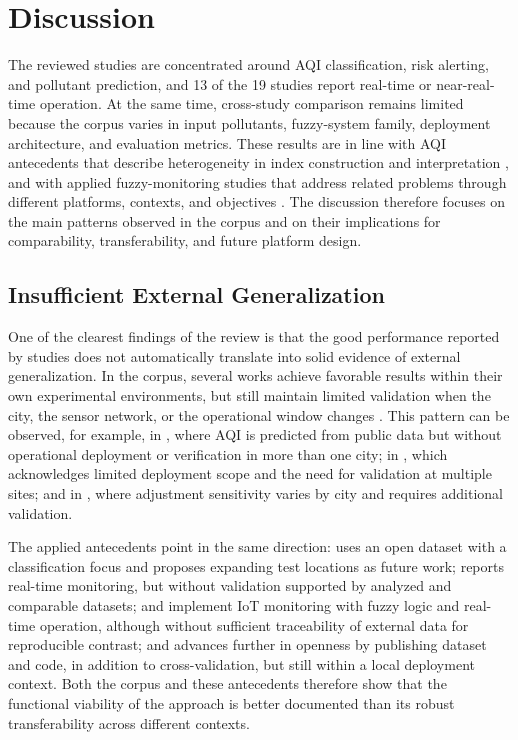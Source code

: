 \section{Discussion}
The reviewed studies are concentrated around AQI classification, risk alerting, and pollutant prediction, and 13 of the 19 studies report real-time or near-real-time operation. At the same time, cross-study comparison remains limited because the corpus varies in input pollutants, fuzzy-system family, deployment architecture, and evaluation metrics. These results are in line with AQI antecedents that describe heterogeneity in index construction and interpretation \cite{ART01,ART02,PROB08}, and with applied fuzzy-monitoring studies that address related problems through different platforms, contexts, and objectives \cite{ART04,ART05,ART06,ART07,ART08}. The discussion therefore focuses on the main patterns observed in the corpus and on their implications for comparability, transferability, and future platform design.

\subsection{Insufficient External Generalization}
One of the clearest findings of the review is that the good performance reported by studies does not automatically translate into solid evidence of external generalization. In the corpus, several works achieve favorable results within their own experimental environments, but still maintain limited validation when the city, the sensor network, or the operational window changes \cite{A028,A084,A087,A144}. This pattern can be observed, for example, in \cite{A028}, where AQI is predicted from public data but without operational deployment or verification in more than one city; in \cite{A144}, which acknowledges limited deployment scope and the need for validation at multiple sites; and in \cite{A084}, where adjustment sensitivity varies by city and requires additional validation.

The applied antecedents point in the same direction: \cite{ART04} uses an open dataset with a classification focus and proposes expanding test locations as future work; \cite{ART05} reports real-time monitoring, but without validation supported by analyzed and comparable datasets; \cite{ART06} and \cite{ART07} implement IoT monitoring with fuzzy logic and real-time operation, although without sufficient traceability of external data for reproducible contrast; and \cite{ART08} advances further in openness by publishing dataset and code, in addition to cross-validation, but still within a local deployment context. Both the corpus and these antecedents therefore show that the functional viability of the approach is better documented than its robust transferability across different contexts.


